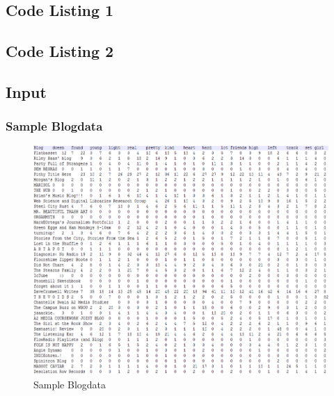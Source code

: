 \subsection{Code Listing 1}


\newpage

\subsection{Code Listing 2}


\newpage




\subsection{Input}

\subsubsection{Sample Blogdata}
\begin{figure}[ht]    
    \begin{center}
        \includegraphics[scale=0.8]{input1.png}
        \caption{Sample Blogdata}
        \label{Sample1}
    \end{center}
\end{figure}
\newpage
